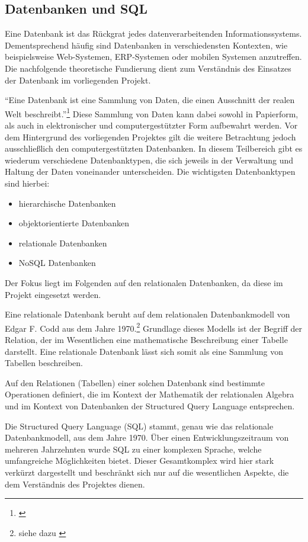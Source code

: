 \subsection{Datenbanken und SQL}
\label{sec:DatenbankenUndSql}

Eine Datenbank ist das Rückgrat jedes datenverarbeitenden Informationssystems.
Dementsprechend häufig sind Datenbanken in verschiedensten Kontexten, wie
beispielsweise Web-Systemen, ERP-Systemen oder mobilen Systemen anzutreffen.
Die nachfolgende theoretische Fundierung dient zum Verständnis des Einsatzes der
Datenbank im vorliegenden Projekt.

"`Eine Datenbank ist eine Sammlung von Daten, die einen Ausschnitt der realen
Welt beschreibt."'\footnote{\citet[S.~18]{elmasri2009}} Diese Sammlung von Daten
kann dabei sowohl in Papierform, als auch in elektronischer und
computergestützter Form aufbewahrt werden. Vor dem Hintergrund des vorliegenden
Projektes gilt die weitere Betrachtung jedoch ausschließlich den
computergestützten Datenbanken. In diesem Teilbereich gibt es wiederum
verschiedene Datenbanktypen, die sich jeweils in der Verwaltung und Haltung der
Daten voneinander unterscheiden. Die wichtigsten Datenbanktypen sind hierbei:

\begin{itemize}
  \item hierarchische Datenbanken
  \item objektorientierte Datenbanken
  \item relationale Datenbanken
  \item NoSQL Datenbanken
\end{itemize}

Der Fokus liegt im Folgenden auf den relationalen Datenbanken, da diese im
Projekt eingesetzt werden.

Eine relationale Datenbank beruht auf dem relationalen Datenbankmodell von
Edgar F. Codd aus dem Jahre 1970.\footnote{siehe dazu \citet{codd1970}}
Grundlage dieses Modells ist der Begriff der Relation, der im Wesentlichen eine
mathematische Beschreibung einer Tabelle darstellt. Eine relationale Datenbank
lässt sich somit als eine Sammlung von Tabellen beschreiben.

Auf den Relationen (Tabellen) einer solchen Datenbank sind bestimmte
Operationen definiert, die im Kontext der Mathematik der relationalen Algebra
und im Kontext von Datenbanken der Structured Query Language entsprechen.

Die Structured Query Language (SQL) stammt, genau wie das relationale
Datenbankmodell, aus dem Jahre 1970. Über einen Entwicklungszeitraum von
mehreren Jahrzehnten wurde SQL zu einer komplexen Sprache, welche umfangreiche
Möglichkeiten bietet. Dieser Gesamtkomplex wird hier stark verkürzt dargestellt
und beschränkt sich nur auf die wesentlichen Aspekte, die dem Verständnis des
Projektes dienen.

